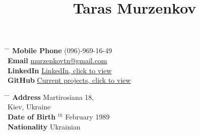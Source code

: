 \documentclass[10pt]{article} %
\begin{document}


\title{Taras Murzenkov } %


\parbox{0.2\textwidth}{ %
\begin{tabbing} %
\hspace{3cm} \= \hspace{4cm} \= \kill %
{\bf Mobile Phone} \> (096)-969-16-49\\ %
{\bf Email} \> \href{mailto:murzenkovtn@gmail.com}{murzenkovtn@gmail.com} \\ %
{\bf LinkedIn} \> \href{https://www.linkedin.com/in/tarasmurzenkov}{LinkedIn, click to view} \\ %
{\bf GitHub} \> \href{https://github.com/terancet/}{Current projects, click to view}\\ %
\end{tabbing}}
\hfill %
\parbox{0.5\textwidth}{ %
\begin{tabbing} %
\hspace{3cm} \= \hspace{4cm} \= \kill %
{\bf Address} \> Martirosiana 18,\\ %
\> Kiev, Ukraine \\ %
{\bf Date of Birth} $^{th}$ February 1989 \\ %
{\bf Nationality} \> Ukrainian %
{\bf } \>      

\end{tabbing}}

\end{document}
